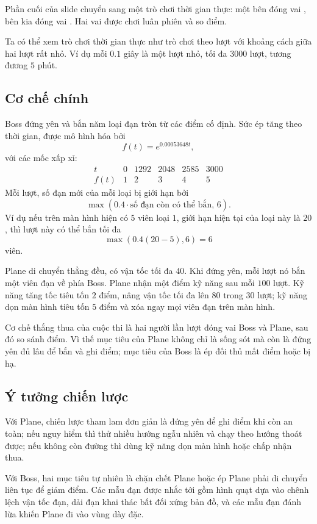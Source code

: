 \documentclass[11pt]{article}
\begin{document}
Phần cuối của slide chuyển sang một trò chơi thời gian thực: một bên đóng vai
, bên kia đóng vai . Hai vai được chơi luân phiên và
so điểm.

Ta có thể xem trò chơi thời gian thực như trò chơi theo lượt với khoảng cách
giữa hai lượt rất nhỏ. Ví dụ mỗi \(0.1\) giây là một lượt nhỏ, tối đa
\(3000\) lượt, tương đương \(5\) phút.

\subsection{Cơ chế chính}

Boss đứng yên và bắn năm loại đạn tròn từ các điểm cố định. Sức ép tăng theo
thời gian, được mô hình hóa bởi
\[
  f(t)=e^{0.00053648t},
\]
với các mốc xấp xỉ:
\[
\begin{array}{c|ccccc}
t&0&1292&2048&2585&3000\\
\hline
f(t)&1&2&3&4&5
\end{array}
\]
Mỗi lượt, số đạn mới của mỗi loại bị giới hạn bởi
\[
  \max(0.4\cdot\text{số đạn còn có thể bắn},\,6).
\]
Ví dụ nếu trên màn hình hiện có \(5\) viên loại \(1\), giới hạn hiện tại của
loại này là \(20\), thì lượt này có thể bắn tối đa
\[
  \max(0.4(20-5),6)=6
\]
viên.

Plane di chuyển thẳng đều, có vận tốc tối đa \(40\). Khi đứng yên, mỗi lượt
nó bắn một viên đạn về phía Boss. Plane nhận một điểm kỹ năng sau mỗi
\(100\) lượt. Kỹ năng tăng tốc tiêu tốn \(2\) điểm, nâng vận tốc tối đa lên
\(80\) trong \(30\) lượt; kỹ năng dọn màn hình tiêu tốn \(5\) điểm và xóa
ngay mọi viên đạn trên màn hình.

Cơ chế thắng thua của cuộc thi là hai người lần lượt đóng vai Boss và Plane,
sau đó so sánh điểm. Vì thế mục tiêu của Plane không chỉ là sống sót mà còn là
đứng yên đủ lâu để bắn và ghi điểm; mục tiêu của Boss là ép đối thủ mất điểm
hoặc bị hạ.

\subsection{Ý tưởng chiến lược}

Với Plane, chiến lược tham lam đơn giản là đứng yên để ghi điểm khi còn an
toàn; nếu nguy hiểm thì thử nhiều hướng ngẫu nhiên và chạy theo hướng thoát
được; nếu không còn đường thì dùng kỹ năng dọn màn hình hoặc chấp nhận thua.

Với Boss, hai mục tiêu tự nhiên là chặn chết Plane hoặc ép Plane phải di
chuyển liên tục để giảm điểm. Các mẫu đạn được nhắc tới gồm hình quạt dựa vào
chênh lệch vận tốc đạn, dải đạn khai thác bất đối xứng bản đồ, và các mẫu
đạn đánh lừa khiến Plane đi vào vùng dày đặc.
\end{document}
